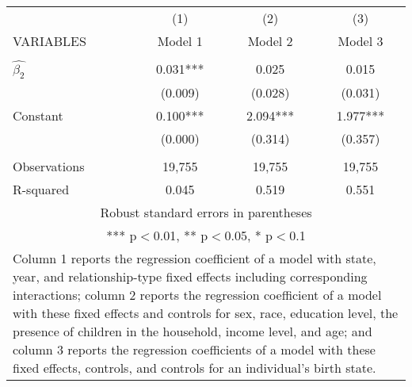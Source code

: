\begin{tabular}{lccc}
\hline
 & (1) & (2) & (3) \\
VARIABLES & Model 1 & Model 2 & Model 3 \\ \hline
 &  &  &  \\
$\hat{\beta_2}$ & 0.031*** & 0.025 & 0.015 \\
 & (0.009) & (0.028) & (0.031) \\
Constant & 0.100*** & 2.094*** & 1.977*** \\
 & (0.000) & (0.314) & (0.357) \\
 &  &  &  \\
Observations & 19,755 & 19,755 & 19,755 \\
 R-squared & 0.045 & 0.519 & 0.551 \\ \hline
\multicolumn{4}{c}{ Robust standard errors in parentheses} \\
\multicolumn{4}{c}{ *** p$<$0.01, ** p$<$0.05, * p$<$0.1} \\
\multicolumn{4}{p{0.6\linewidth}}{\footnotesize Column 1 reports the regression coefficient of a model with state, year, and relationship-type fixed effects including corresponding interactions; column 2 reports the regression coefficient of a model with these fixed effects and controls for sex, race, education level, the presence of children in the household, income level, and age; and column 3 reports the regression coefficients of a model with these fixed effects, controls, and controls for an individual’s birth state.} \\
\end{tabular}
